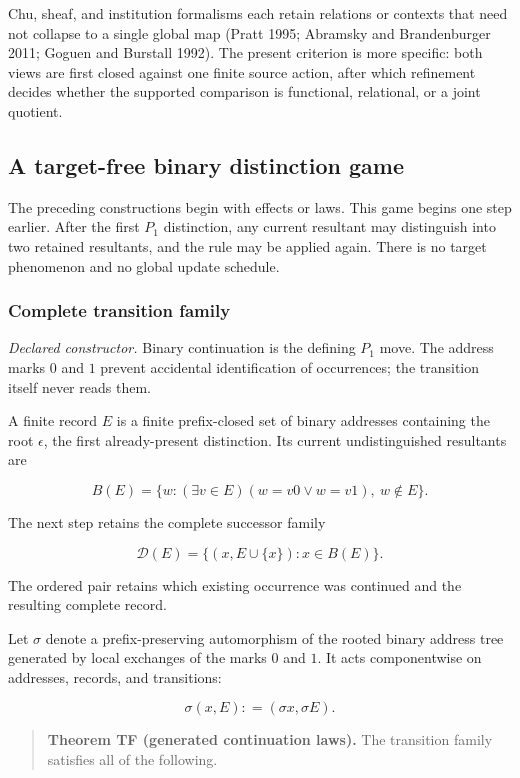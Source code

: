 \documentclass[11pt,a4paper]{article}
\begin{document}
Chu, sheaf, and institution formalisms each retain relations or contexts
that need not collapse to a single global map (Pratt 1995; Abramsky and
Brandenburger 2011; Goguen and Burstall 1992). The present criterion is
more specific: both views are first closed against one finite source
action, after which refinement decides whether the supported comparison
is functional, relational, or a joint quotient.

\subsection{A target-free binary distinction
game}

The preceding constructions begin with effects or laws. This game begins
one step earlier. After the first \(P_{1}\) distinction, any current
resultant may distinguish into two retained resultants, and the rule may
be applied again. There is no target phenomenon and no global update
schedule.

\subsubsection{Complete transition
family}

\emph{Declared constructor.} Binary continuation is the defining
\(P_{1}\) move. The address marks \(0\) and \(1\) prevent accidental
identification of occurrences; the transition itself never reads them.

A finite record \(E\) is a finite prefix-closed set of binary addresses
containing the root \(\epsilon\), the first already-present distinction.
Its current undistinguished resultants are

\[B(E) = \{ w:(\exists v \in E)(w = v0 \vee w = v1),\ w \notin E\}.\]

The next step retains the complete successor family

\[\mathcal{D}(E) = \{\left( x,E \cup \{ x\} \right):x \in B(E)\}.\]

The ordered pair retains which existing occurrence was continued and the
resulting complete record.

Let \(\sigma\) denote a prefix-preserving automorphism of the rooted
binary address tree generated by local exchanges of the marks \(0\) and
\(1\). It acts componentwise on addresses, records, and transitions:

\[\sigma(x,E): = (\sigma x,\sigma E).\]

\begin{quote}
\textbf{Theorem TF (generated continuation laws).} The transition family
satisfies all of the following.
\end{quote}
\end{document}

